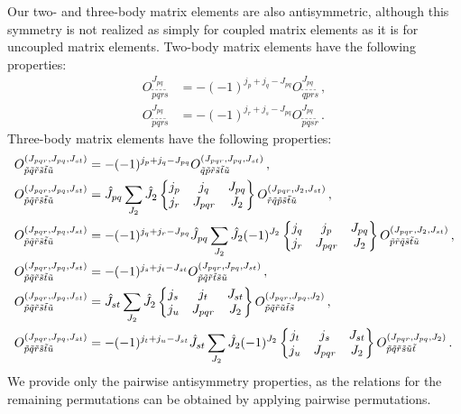 Our two- and three-body matrix elements are also antisymmetric,
although this symmetry is not realized as simply
for coupled matrix elements as it is for uncoupled matrix elements.
Two-body matrix elements have the following properties:
\begin{subequations}
  \begin{align}
    O_{\tilde{p}\tilde{q}\tilde{r}\tilde{s}}^{J_{pq}} & =
    - (-1)^{j_p + j_q - J_{pq}}
    O_{\tilde{q}\tilde{p}\tilde{r}\tilde{s}}^{J_{pq}}\,,  \\
    O_{\tilde{p}\tilde{q}\tilde{r}\tilde{s}}^{J_{pq}} & =
    - (-1)^{j_r + j_s - J_{pq}}
    O_{\tilde{p}\tilde{q}\tilde{s}\tilde{r}}^{J_{pq}}\,.
  \end{align}
\end{subequations}
Three-body matrix elements have the following properties:
\begin{subequations}
  \begin{align}
    O_{\tilde{p}\tilde{q}\tilde{r}\tilde{s}\tilde{t}\tilde{u}}^{(J_{pqr}, J_{pq}, J_{st})} & =
    - (-1)^{j_p + j_q - J_{pq}}
    O_{\tilde{q}\tilde{p}\tilde{r}\tilde{s}\tilde{t}\tilde{u}}^{(J_{pqr}, J_{pq}, J_{st})}\,,  \\
    O_{\tilde{p}\tilde{q}\tilde{r}\tilde{s}\tilde{t}\tilde{u}}^{(J_{pqr}, J_{pq}, J_{st})} & =
    \hat{J}_{pq}
    \sum_{J_{2}} \hat{J}_{2}
    \sixj{j_p}{j_q}{J_{pq}}{j_r}{J_{pqr}}{J_{2}}
    O_{\tilde{r}\tilde{q}\tilde{p}\tilde{s}\tilde{t}\tilde{u}}^{(J_{pqr}, J_{2}, J_{st})}\,,   \\
    O_{\tilde{p}\tilde{q}\tilde{r}\tilde{s}\tilde{t}\tilde{u}}^{(J_{pqr}, J_{pq}, J_{st})} & =
    - (-1)^{j_q + j_r - J_{pq}}
    \hat{J}_{pq}
    \sum_{J_{2}} \hat{J}_{2} (-1)^{J_{2}}
    \sixj{j_q}{j_p}{J_{pq}}{j_r}{J_{pqr}}{J_{2}}
    O_{\tilde{p}\tilde{r}\tilde{q}\tilde{s}\tilde{t}\tilde{u}}^{(J_{pqr}, J_{2}, J_{st})}\,,   \\
    O_{\tilde{p}\tilde{q}\tilde{r}\tilde{s}\tilde{t}\tilde{u}}^{(J_{pqr}, J_{pq}, J_{st})} & =
    - (-1)^{j_s + j_t - J_{st}}
    O_{\tilde{p}\tilde{q}\tilde{r}\tilde{t}\tilde{s}\tilde{u}}^{(J_{pqr}, J_{pq}, J_{st})}\,,  \\
    O_{\tilde{p}\tilde{q}\tilde{r}\tilde{s}\tilde{t}\tilde{u}}^{(J_{pqr}, J_{pq}, J_{st})} & =
    \hat{J}_{st}
    \sum_{J_{2}} \hat{J}_{2}
    \sixj{j_s}{j_t}{J_{st}}{j_u}{J_{pqr}}{J_{2}}
    O_{\tilde{p}\tilde{q}\tilde{r}\tilde{u}\tilde{t}\tilde{s}}^{(J_{pqr}, J_{pq}, J_{2})}\,,   \\
    O_{\tilde{p}\tilde{q}\tilde{r}\tilde{s}\tilde{t}\tilde{u}}^{(J_{pqr}, J_{pq}, J_{st})} & =
    - (-1)^{j_t + j_u - J_{st}}
    \hat{J}_{st}
    \sum_{J_{2}} \hat{J}_{2} (-1)^{J_{2}}
    \sixj{j_t}{j_s}{J_{st}}{j_u}{J_{pqr}}{J_{2}}
    O_{\tilde{p}\tilde{q}\tilde{r}\tilde{s}\tilde{u}\tilde{t}}^{(J_{pqr}, J_{pq}, J_{2})}\,.
  \end{align}
\end{subequations}
We provide only the pairwise antisymmetry properties,
as the relations for the remaining permutations
can be obtained by applying pairwise permutations.

